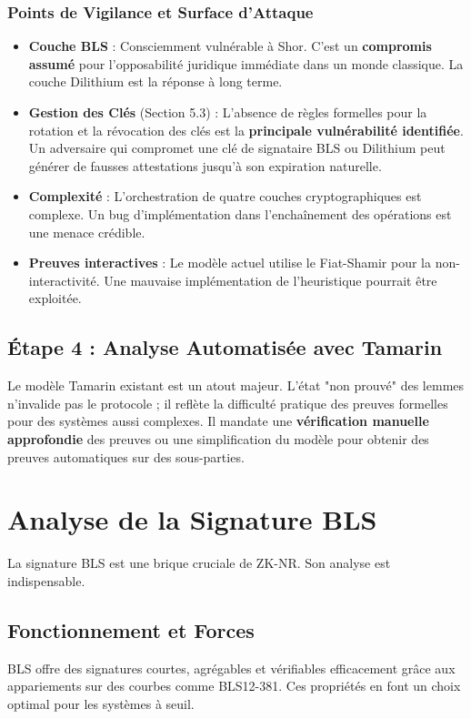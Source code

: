 \subsubsection{Points de Vigilance et Surface d'Attaque}
\label{subsubsec:19.1.3.2}
\begin{itemize}
    \item \textbf{Couche BLS} : Consciemment vulnérable à Shor. C'est un \textbf{compromis assumé} pour l'opposabilité juridique immédiate dans un monde classique. La couche Dilithium est la réponse à long terme.
    \item \textbf{Gestion des Clés} (Section 5.3) : L'absence de règles formelles pour la rotation et la révocation des clés est la \textbf{principale vulnérabilité identifiée}. Un adversaire qui compromet une clé de signataire BLS ou Dilithium peut générer de fausses attestations jusqu'à son expiration naturelle.
    \item \textbf{Complexité} : L'orchestration de quatre couches cryptographiques est complexe. Un bug d'implémentation dans l'enchaînement des opérations est une menace crédible.
    \item \textbf{Preuves interactives} : Le modèle actuel utilise le Fiat-Shamir pour la non-interactivité. Une mauvaise implémentation de l'heuristique pourrait être exploitée.
\end{itemize}

\subsection{Étape 4 : Analyse Automatisée avec Tamarin}
\label{subsec:19.1.4}
Le modèle Tamarin existant est un atout majeur. L'état "non prouvé" des lemmes n'invalide pas le protocole ; il reflète la difficulté pratique des preuves formelles pour des systèmes aussi complexes. Il mandate une \textbf{vérification manuelle approfondie} des preuves ou une simplification du modèle pour obtenir des preuves automatiques sur des sous-parties.

\section{Analyse de la Signature BLS}
\label{sec:19.2}

La signature BLS est une brique cruciale de ZK-NR. Son analyse est indispensable.

\subsection{Fonctionnement et Forces}
\label{subsec:19.2.1}
BLS offre des signatures courtes, agrégables et vérifiables efficacement grâce aux appariements sur des courbes comme BLS12-381. Ces propriétés en font un choix optimal pour les systèmes à seuil.

